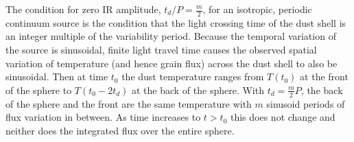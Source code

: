 





The condition for zero IR amplitude, $t_d/P = \frac{m}{2}$, for an isotropic,
periodic continuum source is the condition that the light crossing time of the
dust shell is an integer multiple of the variability period. Because the
temporal variation of the source is sinusoidal, finite light travel time
causes the observed spatial variation of temperature (and hence grain flux)
across the dust shell to also be sinusoidal. Then at time $t_0$ the dust
temperature ranges from $T(t_0)$ at the front of the sphere to $T(t_0 - 2t_d)$
at the back of the sphere. With $t_d = \frac{m}{2}P$, the back of the sphere
and the front are the same temperature with $m$ sinusoid periods of flux
variation in between. As time increases to $t > t_0$ this does not change and
neither does the integrated flux over the entire sphere.



